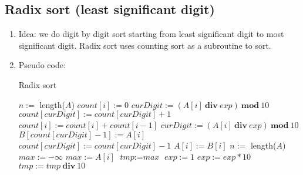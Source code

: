 \documentclass[12pt]{article}
\begin{document}
    \subsection{Radix sort (least significant digit)}
    \begin{enumerate}
        \item Idea: we do digit by digit sort starting from least significant digit to most significant digit. Radix sort uses counting sort as a subroutine to sort.
        \item Pseudo code:
        \begin{algorithm}[H]
            \caption{Radix sort}
            \begin{algorithmic}[1]
                    \State $n:=$ length($A$)
                        \State $\textit{count}[i]:=0$
                    \EndFor
                        \State $\textit{curDigit}:=(A[i]\ \textbf{div}\ exp)\ \textbf{mod}\ 10$
                        \State $\textit{count}[curDigit]:=\textit{count}[curDigit]+1$
                    \EndFor
                        \State $\textit{count}[i]:=\textit{count}[i]+\textit{count}[i-1]$
                    \EndFor
                        \State $\textit{curDigit}:=(A[i]\ \textbf{div}\ exp)\ \textbf{mod}\ 10$
                        \State $B[\textit{count}[curDigit]-1]:=A[i]$
                        \State $\textit{count}[curDigit]:=\textit{count}[curDigit]-1$
                    \EndFor
                        \State $A[i]:=B[i]$
                    \EndFor
                \EndFunction
                \State
                \State $n:=$ length($A$)
                \State $\textit{max}:=-\infty$
                        \State $\textit{max}:=A[i]$
                    \EndIf
                \EndFor 
                \State $\textit{tmp}:=\textit{max}$
                \State $\textit{exp}:=1$
                    \State {}
                    \State $\textit{exp}:=\textit{exp}*10$
                    \State $\textit{tmp}:=\textit{tmp}\ \textbf{div}\ 10$
                \EndWhile
                \EndFunction

\end{algorithmic}
\end{algorithm}
\end{enumerate}
\end{document}

